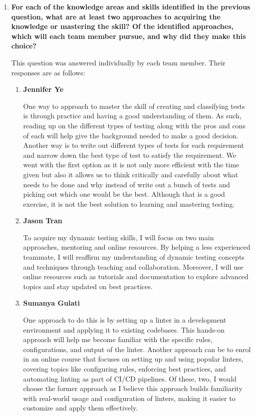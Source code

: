 \documentclass[12pt, titlepage]{article}
\begin{document}
\begin{enumerate}
  \smallskip
  \item \textbf{For each of the knowledge areas and skills identified in the
  previous question, what are at least two approaches to acquiring the knowledge
  or mastering the skill?  Of the identified approaches, which will each team
  member pursue, and why did they make this choice?}

    This question was answered individually by each team member. Their responses
    are as follows:
    \begin{enumerate}
      \item \textbf{Jennifer Ye}
        
        One way to approach to master the skill of creating and classifying
        tests is through practice and having a good understanding of them. As
        such, reading up on the different types of testing along with the pros
        and cons of each will help give the background needed to make a good
        decision. Another way is to write out different types of tests for each
        requirement and narrow down the best type of test to satisfy the
        requirement. We went with the first option as it is not only more
        efficient with the time given but also it allows us to think critically
        and carefully about what needs to be done and why instead of write out a
        bunch of tests and picking out which one would be the best. Although
        that is a good exercise, it is not the best solution to learning and
        mastering testing.

      \item \textbf{Jason Tran}
      
        To acquire my dynamic testing skills, I will focus on two main
        approaches, mentoring and online resources. By helping a less
        experienced teammate, I will reaffirm my understanding of dynamic
        testing concepts and techniques through teaching and collaboration.
        Moreover, I will use online resources such as tutorials and
        documentation to explore advanced topics and stay updated on best
        practices.

      \item \textbf{Sumanya Gulati}
      
        One approach to do this is by setting up a linter in a development
        environment and applying it to existing codebases. This hands-on
        approach will help me become familiar with the specific rules,
        configurations, and output of the linter. Another approach can be to
        enrol in an online course that focuses on setting up and using popular
        linters, covering topics like configuring rules, enforcing best
        practices, and automating linting as part of CI/CD pipelines. Of these,
        two, I would choose the former approach as I believe this approach
        builds familiarity with real-world usage and configuration of linters,
        making it easier to customize and apply them effectively.


\end{enumerate}
\end{enumerate}
\end{document}
